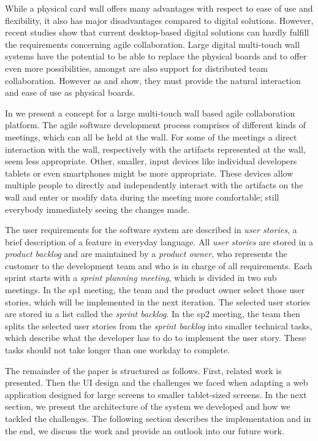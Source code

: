 \documentclass{sigchi}
\begin{document}
While a physical card wall offers many advantages with respect to ease of use and flexibility, it also has major disadvantages compared to digital solutions. However, recent studies \cite{udcw:31721, Mateescu:2015} show that current desktop-based digital solutions can hardly fulfill the requirements concerning agile collaboration.
Large digital multi-touch wall systems have the potential to be able to replace the physical boards and to offer even more possibilities, amongst are also support for distributed team collaboration. However as \cite{udcw:31721} and \cite{Mateescu:2015} show, they must provide the natural interaction and ease of use as physical boards. 

In \cite{Mateescu:2015} we present a concept for a large multi-touch wall based agile collaboration platform. The agile software development process comprises of different kinds of meetings, which can all be held at the wall. For some of the meetings a direct interaction with the wall, respectively with the artifacts represented at the wall, seem less appropriate. Other, smaller, input devices like individual developers tablets or even smartphones might be more appropriate. These devices allow multiple people to directly and independently interact with the artifacts on the wall and enter or modify data during the meeting more comfortable; still everybody immediately seeing the changes made. 


The user requirements for the software system are described in \textit{user stories}, a brief description of a feature in everyday language.
All \textit{user stories} are stored in a \textit{product backlog} and are maintained by a \textit{product owner}, who represents the customer to the development team and who is in charge of all requirements.
Each sprint starts with a \textit{sprint planning meeting}, which is divided in two sub meetings. In the \gls{sp1} meeting, the team and the product owner select those user stories, which will be implemented in the next iteration.
The selected user stories are stored in a list called the \textit{sprint backlog}.
In the \gls{sp2} meeting, the team then splits the selected user stories from the \textit{sprint backlog} into smaller technical tasks, which describe what the developer has to do to implement the user story. These tasks should not take longer than one workday to complete.


The remainder of the paper is structured as follows.
First, related work is presented.
Then the UI design and the challenges we faced when adapting a web application designed for large screens to smaller tablet-sized screens.
In the next section, we present the architecture of the system we developed and how we tackled the challenges.
The following section describes the implementation and in the end, we discuss the work and provide an outlook into our future work.
\end{document}
